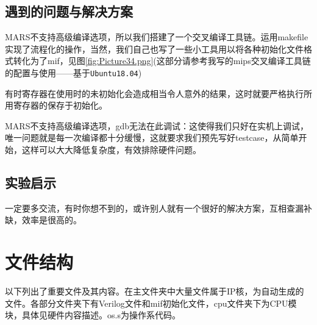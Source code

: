 \clearpage
\section{遇到的问题与解决方案}
    MARS不支持高级编译选项，所以我们搭建了一个交叉编译工具链。运用makefile实现了流程化的操作，当然，我们自己也写了一些小工具用以将各种初始化文件格式转化为了mif，见图\ref{fig:Picture34.png}(这部分请参考我写的mips交叉编译工具链的配置与使用——基于\verb|Ubuntu18.04|)\par
    有时寄存器在使用时的未初始化会造成相当令人意外的结果，这时就要严格执行所用寄存器的保存于初始化。\par
    MARS不支持高级编译选项，gdb无法在此调试：这使得我们只好在实机上调试，唯一问题就是每一次编译都十分缓慢，这就要求我们预先写好testcase，从简单开始，这样可以大大降低复杂度，有效排除硬件问题。
\section{实验启示}
    一定要多交流，有时你想不到的，或许别人就有一个很好的解决方案，互相查漏补缺，效率是很高的。

\chapter{文件结构} \label{sec:wjml}
    以下列出了重要文件及其内容。在主文件夹中大量文件属于IP核，为自动生成的文件。各部分文件夹下有Verilog文件和mif初始化文件，cpu文件夹下为CPU模块，具体见硬件内容描述。os.s为操作系代码。
